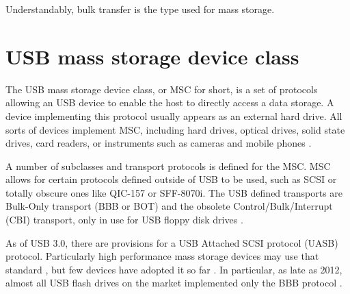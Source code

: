             Understandably, bulk transfer is the type used for mass storage.
            

    \section{USB mass storage device class}
        The USB mass storage device class, or MSC for short, is a set of protocols allowing an USB device to enable the host to directly access a data storage.  A device implementing this protocol usually appears as an external hard drive.  All sorts of devices implement MSC, including hard drives, optical drives, solid state drives, card readers, or instruments such as cameras and mobile phones \cite{usb-keil-msc}.
        
        A number of subclasses and transport protocols is defined for the MSC.  MSC allows for certain protocols defined outside of USB to be used, such as SCSI or totally obscure ones like QIC-157 or SFF-8070i.  The USB defined transports are Bulk-Only transport (BBB or BOT) and the obsolete Control/Bulk/Interrupt (CBI) transport, only in use for USB floppy disk drives \cite{usb-mass-storage} \cite{usb-mass-bulk}.
        
        As of USB 3.0, there are provisions for a USB Attached SCSI protocol (UASB) protocol.  Particularly high performance mass storage devices may use that standard \cite{usb-electronicdesign-usb-uasp-bot}, but few devices have adopted it so far \cite{usb-winaero-usb-scsi-uas}.  In particular, as late as 2012, almost all USB flash drives on the market implemented only the BBB protocol \cite{usb-qemu-usb-storage}.
        

